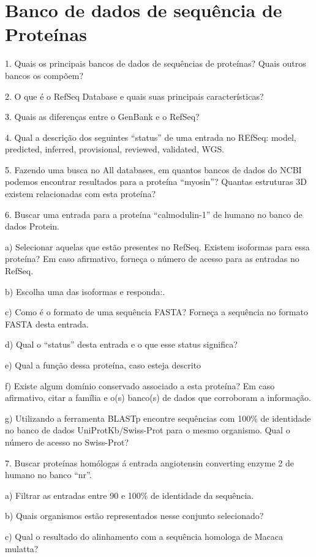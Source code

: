 \section{Banco de dados de sequência de Proteínas}

1. Quais os principais bancos de dados de sequências de proteínas? Quais outros bancos os compõem?


2. O que é o RefSeq Database e quais suas principais características?


3. Quais as diferenças entre o GenBank e o RefSeq?


4. Qual a descrição dos seguintes ``status'' de uma entrada no REfSeq: model, predicted, inferred, provisional, reviewed, validated, WGS.


5. Fazendo uma busca no All databases, em quantos bancos de dados do NCBI podemos encontrar resultados para a proteína “myosin”? Quantas estruturas 3D existem relacionadas com esta proteína? 


6. Buscar uma entrada para a proteína “calmodulin-1” de humano no banco de dados Protein. 



a) Selecionar aquelas que estão presentes no RefSeq. Existem isoformas para essa proteína? Em caso afirmativo, forneça o número de acesso para as entradas no RefSeq.


b) Escolha uma das isoformas e responda:. 

c)  Como é o formato de uma sequência FASTA? Forneça a sequência no formato FASTA desta entrada.  


d)  Qual o “status” desta entrada e o que esse status significa?

    
e)  Qual a função dessa proteína, caso esteja descrito
    
    
f) Existe algum domínio conservado associado a esta proteína? Em caso afirmativo, citar a família e o(s) banco(s) de dados que corroboram a informação.


g) Utilizando a ferramenta BLASTp encontre sequências com 100\% de identidade no banco de dados UniProtKb/Swiss-Prot para o mesmo organismo. Qual o número de acesso no Swiss-Prot?



7. Buscar proteínas homólogas á entrada angiotensin converting enzyme 2 de humano no banco ``nr''.


a) Filtrar as entradas entre 90 e 100\% de identidade da sequência.


b) Quais organismos estão representados nesse conjunto selecionado?


c) Qual o resultado do alinhamento com a sequência homologa de Macaca mulatta?
 